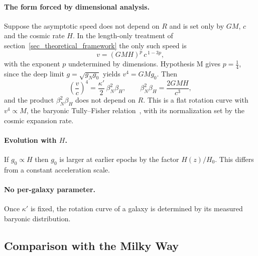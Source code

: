 \documentclass[pdflatex,sn-mathphys-num]{sn-jnl}%
\theoremstyle{thmstyleone}%
\theoremstyle{thmstyletwo}%
\theoremstyle{thmstylethree}%
\begin{document}
\paragraph{The form forced by dimensional analysis.} Suppose the asymptotic speed does not depend on $R$ and is set only by $GM$, $c$ and the cosmic rate $H$. In the length-only treatment of section~\ref{sec_theoretical_framework} the only such speed is
\begin{equation}
    v=(GMH)^{p}\,c^{\,1-3p},
\end{equation}
with the exponent $p$ undetermined by dimensions. Hypothesis M gives $p=\tfrac14$, since the deep limit $g=\sqrt{g_Ng_0}$ yields $v^{4}=GMg_0$. Then
\begin{equation}\label{eq_btfr_flows}
    \left(\frac{v}{c}\right)^{4}=\frac{\kappa'}{2}\,\beta_N^{2}\beta_H,
    \qquad
    \beta_N^{2}\beta_H=\frac{2GMH}{c^{3}},
\end{equation}
and the product $\beta_N^{2}\beta_H$ does not depend on $R$. This is a flat rotation curve with $v^{4}\propto M$, the baryonic Tully--Fisher relation~\cite{McGaugh2000BTFR}, with its normalization set by the cosmic expansion rate.

\paragraph{Evolution with $H$.} If $g_0\propto H$ then $g_0$ is larger at earlier epochs by the factor $H(z)/H_0$. This differs from a constant acceleration scale.

\paragraph{No per-galaxy parameter.} Once $\kappa'$ is fixed, the rotation curve of a galaxy is determined by its measured baryonic distribution.

\subsection{Comparison with the Milky Way}
\end{document}

